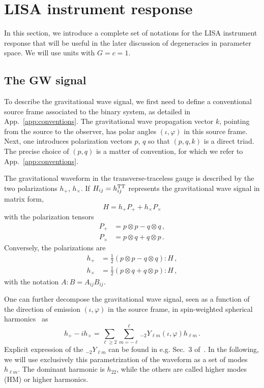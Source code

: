 \documentclass[aps,showpacs,twocolumn,prd,superscriptaddress,nofootinbib]{revtex4-1}
\newcommand{\be}{\begin{equation}}
\newcommand{\ee}{\end{equation}}
\newcommand{\bsub}{\begin{subequations}}
\newcommand{\esub}{\end{subequations}}
\begin{document}

\section{LISA instrument response}
\label{sec:response}

In this section, we introduce a complete set of notations for the LISA instrument response that will be useful in the later discussion of degeneracies in parameter space. We will use units with $G=c=1$.


\subsection{The GW signal}
\label{sec:gwsignal}

To describe the gravitational wave signal, we first need to define a conventional source frame associated to the binary system, as detailed in App.~\ref{app:conventions}. The gravitational wave propagation vector $k$, pointing from the source to the observer, has polar angles $(\iota, \varphi)$ in this source frame. Next, one introduces polarization vectors $p$, $q$ so that $(p, q, k)$ is a direct triad. The precise choice of $(p,q)$ is a matter of convention, for which we refer to App.~\ref{app:conventions}.

The gravitational waveform in the transverse-traceless gauge is described by the two polarizations $h_{+}$, $h_{\times}$. If $H_{ij} = h_{ij}^{\rm TT}$ represents the gravitational wave signal in matrix form,
\be
	H = h_{+} P_{+} + h_{\times} P_{\times}
\ee
with the polarization tensors
\bsub
\begin{align}
	P_{+} &= p \otimes p - q \otimes q \,,\\
	P_{\times} &= p \otimes q + q \otimes p \,.
\end{align}
\esub
Conversely, the polarizations are
\bsub
\begin{align}
	h_{+} &= \frac{1}{2} \left(p \otimes p - q \otimes q \right) : H \,,\\
	h_{\times} &= \frac{1}{2} \left( p \otimes q + q \otimes p \right) : H \,,
\end{align}
\esub
with the notation $A : B = A_{ij}B_{ij}$.

One can further decompose the gravitational wave signal, seen as a function of the direction of emission $(\iota, \varphi)$ in the source frame, in spin-weighted spherical harmonics~\cite{Goldberg+67} as
\be\label{eq:hpcmodes}
	h_{+} - i h_{\times} = \sum_{\ell \geq 2} \sum_{m = -\ell}^{\ell} {}_{-2}Y_{\ell m} (\iota, \varphi) h_{\ell m} \,.
\ee
Explicit expression of the ${}_{-2}Y_{\ell m}$ can be found in e.g. Sec.~3 of~\cite{BlanchetLiving}. In the following, we will use exclusively this parametrization of the waveform as a set of modes $h_{\ell m}$. The dominant harmonic is $h_{22}$, while the others are called higher modes (HM) or higher harmonics.
\end{document}
